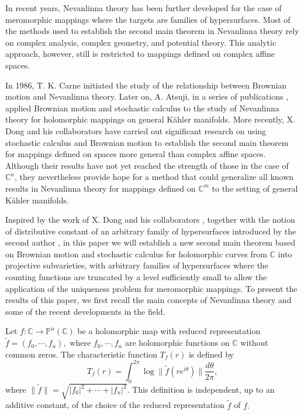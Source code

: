 \documentclass[12pt]{amsart}
\newcommand{\C}{{\mathbb{C}}}
\renewcommand{\P}{{\mathbb{P}}}
\begin{document}
In recent years, Nevanlinna theory has been further developed for the case of meromorphic mappings where the targets are families of hypersurfaces. Most of the methods used to establish the second main theorem in Nevanlinna theory rely on complex analysis, complex geometry, and potential theory. This analytic approach, however, still is restricted to mappings defined on complex affine spaces.

In 1986, T. K. Carne \cite{Car} initiated the study of the relationship between Brownian motion and Nevanlinna theory. Later on, A. Atsuji, in a series of publications \cite{A1,A2,A3,A4}, applied Brownian motion and stochastic calculus to the study of Nevanlinna theory for holomorphic mappings on general K\"{a}hler manifolds. More recently, X. Dong and his collaborators \cite{RCD,D1,D2,D3} have carried out significant research on using stochastic calculus and Brownian motion to establish the second main theorem for mappings defined on spaces more general than complex affine spaces. Although their results have not yet reached the strength of those in the case of $\C^n$, they nevertheless provide hope for a method that could generalize all known results in Nevanlinna theory for mappings defined on $\C^m$ to the setting of general K\"{a}hler manifolds.

Inspired by the work of X. Dong and his collaborators \cite{RCD}, together with the notion of distributive constant of an arbitrary family of hypersurfaces introduced by the second author \cite{Q21}, in this paper we will establish a new second main theorem based on Brownian motion and stochastic calculus for holomorphic curves from $\C$ into projective subvarieties, with arbitrary families of hypersurfaces where the counting functions are truncated by a level sufficiently small to allow the application of the uniqueness problem for meromorphic mappings. To present the results of this paper, we first recall the main concepts of Nevanlinna theory and some of the recent developments in the field.

Let $f:\C\to\P^n(\C)$ be a holomorphic map with reduced representation $\tilde f=(f_0,\cdots,f_n),$ where $f_0,\cdots,f_n$ are holomorphic functions on $\C$ without common zeros. The characteristic function $T_f(r)$ is defined by
$$T_f(r)=\int_0^{2\pi}\log\|\tilde f(r e^{i\theta})\|\frac{d\theta}{2\pi},$$
where $\|\tilde f\|=\sqrt{|f_0|^2+\cdots+ |f_n|^2} $. This definition is independent, up to an additive constant, of the choice of the reduced representation $\tilde f$ of $f.$  
\end{document}
